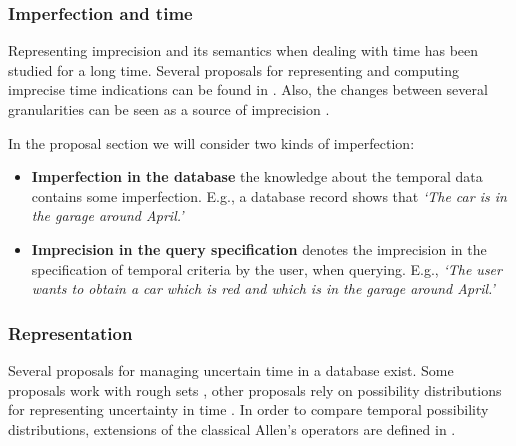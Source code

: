 \subsubsection{Imperfection and time}
Representing imprecision and its semantics when dealing with time has been studied for a long time. Several proposals for representing and computing imprecise time indications can be found in \cite{DeCaluwe1997,DeTre1997}. Also, the changes between several granularities can be seen as a source of imprecision \cite{Devos1998}.

In the proposal section we will consider two kinds of imperfection:
\begin{itemize}
\item \textbf{Imperfection in the database} the knowledge about the temporal data contains some imperfection. E.g., a database record shows that \emph{`The car is in the garage around April.'}
 \item \textbf{Imprecision in the query specification} denotes the imprecision in the specification of temporal criteria by the user, when querying. E.g., \emph{`The user wants to obtain a car which is red and which is in the garage around April.'}
\end{itemize}

\subsubsection{Representation}
Several proposals for managing uncertain time in a database exist. Some proposals work with rough sets \cite{Qiang2009}, other proposals rely on possibility distributions for representing uncertainty in time \cite{Dyreson1998,Garrido2009,Galindo2001}. In order to compare temporal possibility distributions, extensions of the classical Allen's operators \cite{Allen1983} are defined in \cite{Ohlbach2004,Nagypal2003,Dubois2003a,Schockaert2008}.



